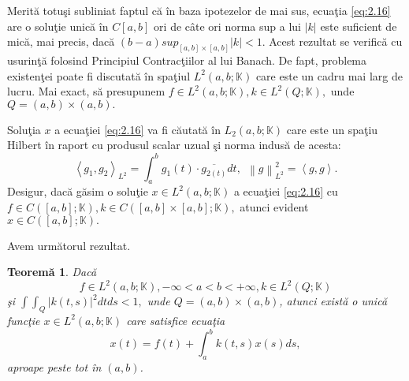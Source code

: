 \documentclass[a4paper,12pt,oneside]{report}
\newtheorem{theorem}{Teorem\u a}
\begin{document}
Merit\u{a} totu\c{s}i subliniat faptul c\u{a} \^{i}n baza ipotezelor de mai sus, ecua\c{t}ia \ref{eq:2.16} are o solu\c{t}ie unic\u{a} \^{i}n \(C\left [ a,b \right ]\) ori de c\^{a}te ori norma sup a lui \(\left | k \right |\) este suficient de mic\u{a}, mai precis, dac\u{a} \(\left ( b-a \right )sup_{\left [ a,b \right ]\times \left [ a,b \right ]}\left | k \right | < 1.\) Acest rezultat se verific\u{a} cu usurin\c{t}\u{a} folosind Principiul Contrac\c{t}iilor al lui Banach. De fapt, problema existen\c{t}ei poate fi discutat\u{a} \^{i}n spa\c{t}iul \(L^{2} \left ( a,b ;\mathbb{K} \right )\) care este un cadru mai larg de lucru. Mai exact, s\u{a} presupunem \(f\in L^{2}\left ( a,b;\mathbb{K} \right ), k\in L^{2}\left ( Q; \mathbb{K} \right ),\) unde \(Q = \left ( a,b \right )\times \left ( a,b \right ).\)

\noindent Solu\c{t}ia $x$ a ecua\c{t}iei \ref{eq:2.16} va fi c\u{a}utat\u{a} \^{i}n \(L_{2}\left ( a,b;\mathbb{K} \right )\) care este un spa\c{t}iu Hilbert \^{i}n raport cu produsul scalar uzual \c{s}i norma indus\u{a} de acesta:
\begin{displaymath}
\left \langle g_{1}, g_{2} \right \rangle_{L^{2}} = \int_{a}^{b}g_{1}\left ( t \right ) \cdot \overline{{g_{2\left ( t \right )}}}dt,~~ \left \| g \right \|_{L^{2}}^{2} = \left \langle g,g \right \rangle.
\end{displaymath}
Desigur, dac\u{a} g\u{a}sim o solu\c{t}ie \(x\in L^{2}\left ( a,b;\mathbb{K} \right )\) a ecua\c{t}iei \ref{eq:2.16} cu \(f\in C\left ( \left [ a,b \right ];\mathbb{K} \right ), k\in C\left ( \left [ a,b \right ]\times \left [ a,b \right ];\mathbb{K} \right ),\) atunci evident \(x\in C\left ( \left [ a,b \right ];\mathbb{K} \right ).\)

\noindent Avem urm\u{a}torul rezultat.

\begin{theorem}
Dac\u{a} \[f\in L^{2}\left ( a,b;\mathbb{K} \right ), -\infty < a< b< +\infty , k\in L^{2}\left ( Q; \mathbb{K} \right )\] \c{s}i \(\int \int _{Q}\left | k\left ( t,s \right ) \right |^{2}dtds< 1,\) unde \(Q = \left ( a,b \right )\times \left ( a,b \right )\), atunci exist\u{a} o unic\u{a} func\c{t}ie \(x\in L^{2} \left ( a,b;\mathbb{K} \right ) \) care satisfice ecua\c{t}ia
\begin{displaymath}
x\left ( t \right ) = f\left ( t \right ) + \int_{a}^{b}k\left ( t,s \right )x\left ( s \right )ds,
\end{displaymath}
aproape peste tot \^{i}n \(\left ( a,b  \right )\).
\end{theorem}	
%
%
%
%
\end{document}
